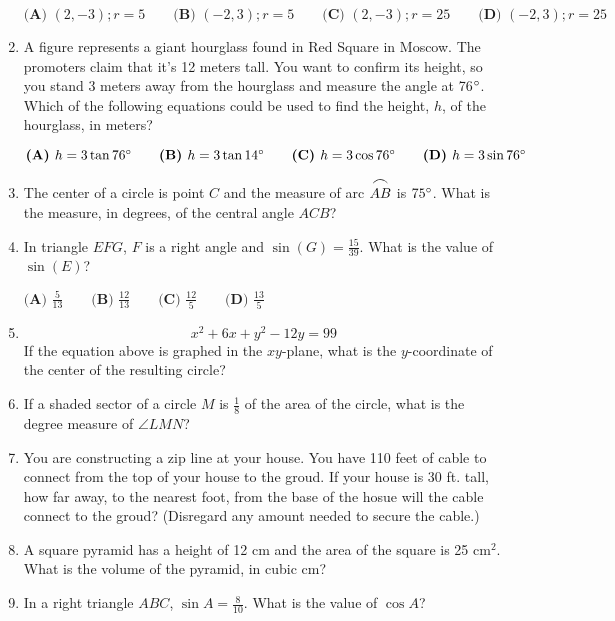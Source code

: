 \documentclass[../satmath.tex]{subfiles}
\begin{document}
\begin{enumerate}[label=\bfseries\arabic*.]
$\textbf{(A) } (2, -3); r=5 \qquad \textbf{(B) } (-2, 3); r=5 \qquad \textbf{(C) } (2, -3); r=25 \qquad \textbf{(D) } (-2 ,3); r=25$
 
\item A figure represents a giant hourglass found in Red Square in Moscow. The promoters claim that it's 12 meters tall. You want to confirm its height, so you stand 
3 meters away from the hourglass and measure the angle at 76$\degree$. Which of the following equations could be used to find the height, $h$, of the hourglass, in meters?

$\textbf{(A) } h=3\tan 76\degree \qquad \textbf{(B) } h=3\tan 14\degree \qquad \textbf{(C) } h=3\cos 76\degree \qquad \textbf{(D) } h=3\sin 76\degree$
 
\item The center of a circle is point $C$ and the measure of arc $\stackrel{\mbox{\large$\frown$}}{AB}$ is $75\degree$. What is the measure, in degrees, of the central angle $ACB$?
 
\item In triangle $EFG$, $F$ is a right angle and $\sin (G) = \frac{15}{39}$. What is the value of $\sin (E)$?

$\textbf{(A) } \frac{5}{13} \qquad \textbf{(B) }\frac{12}{13} \qquad \textbf{(C) }\frac{12}{5} \qquad \textbf{(D) }\frac{13}{5}$
 
\item
\[x^2+6x+y^2-12y=99\]
If the equation above is graphed in the $xy$-plane, what is the $y$-coordinate of the center of the resulting circle?
 
\item If a shaded sector of a circle $M$ is $\frac{1}{8}$ of the area of the circle, what is the degree measure of $\angle LMN$?
 
\item You are constructing a zip line at your house. You have 110 feet of cable to connect from the top of your house to the groud. If your house is 30 ft. tall, how far away, to 
the nearest foot, from the base of the hosue will the cable connect to the groud? (Disregard any amount needed to secure the cable.)
 
\item A square pyramid has a height of 12 cm and the area of the square is 25 cm$^2$. What is the volume of the pyramid, in cubic cm?
 
\item In a right triangle $ABC$, $\sin A = \frac{8}{10}$. What is the value of $\cos A$?
 

\end{enumerate}
\end{document}
